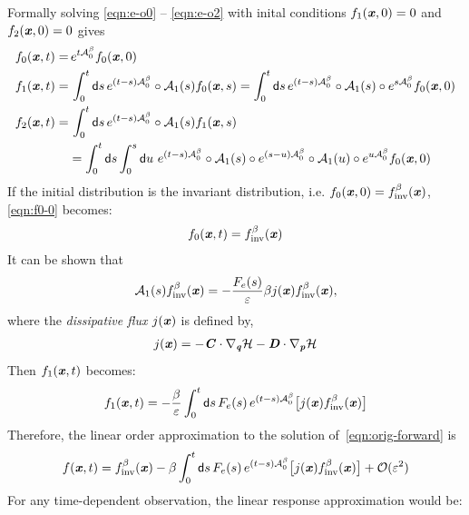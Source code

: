 \documentclass[aip,jcp,a4paper,reprint,onecolumn]{revtex4-1}
\newcommand{\vect}[1]{\textbf{\textit{#1}}}
\newcommand{\dd}{\textsf{d}}
\newcommand{\inv}{\textrm{inv}}
\newcommand{\mh}{\mathcal H}
\newcommand{\mo}{\mathcal O}
\newcommand{\fwg}{{\mathcal A}}
\begin{document}
Formally solving \eqref{eqn:e-o0} -- \eqref{eqn:e-o2} with
inital conditions $f_1(\vect x, 0) = 0$ and $f_2(\vect x, 0) = 0$
gives
\begin{align}\label{eqn:f0-0}
  f_0(\vect x, t)
  =&\,
  e^{t\fwg^\beta_0}f_0(\vect x, 0) \\\label{eqn:f1-0}
  f_1(\vect x, t)
  =&\,
  \int_0^t\dd s\,
  e^{(t-s)\fwg^\beta_0}\circ
  \fwg_1(s) f_0(\vect x,s)
  =
  \int_0^t\dd s\,
  e^{(t-s)\fwg^\beta_0}\circ
  \fwg_1(s)\circ
  e^{s\fwg^\beta_0}f_0(\vect x, 0) \\\nonumber
  f_2(\vect x, t)
  =&\,
  \int_0^t\dd s\,
  e^{(t-s)\fwg^\beta_0}\circ
  \fwg_1(s) f_1(\vect x,s) \\\label{eqn:f2-0}
  &=
  \int_0^t\dd s
  \int_0^s\dd u\,\,
  e^{(t-s)\fwg^\beta_0}\circ
  \fwg_1(s)\circ
  e^{(s-u)\fwg^\beta_0}\circ
  \fwg_1(u)\circ
  e^{u\fwg^\beta_0}
  f_0(\vect x, 0) 
\end{align}
If the initial distribution is the invariant distribution, i.e.
$f_0(\vect x, 0) = f_{\inv}^\beta(\vect x)$,
\eqref{eqn:f0-0} becomes:
\begin{align}
  f_0(\vect x, t) = f_{\inv}^\beta(\vect x)
\end{align}
It can be shown that
\begin{align}
  \fwg_1(s) f_{\inv}^\beta(\vect x)
  =
  -\frac{F_e(s)}{\varepsilon}\beta
  j(\vect x)
  f_{\inv}^\beta(\vect x),
\end{align}
where the \emph{dissipative flux} $j(\vect x)$ is defined by,
\begin{align}
  j(\vect x) =
  -\vect C\cdot\nabla_{\vect q}\mh 
  -\vect D\cdot\nabla_{\vect p}\mh
\end{align}
Then $f_1(\vect x, t)$ becomes:
\begin{align}
  f_1(\vect x, t)
  =
  -\frac\beta\varepsilon
  \int_0^t\dd s\,
  F_e(s)\,
  e^{(t-s)\fwg^\beta_0}
  \big[
  j(\vect x)
  f_{\inv}^\beta(\vect x)
  \big]
\end{align}
Therefore, the linear order approximation to
the solution of~\eqref{eqn:orig-forward} is 
\begin{align}\label{eqn:solv-orig-linear}
  f(\vect x, t) =
  f_{\inv}^\beta(\vect x)
  - \beta
  \int_0^t\dd s\,
  F_e(s)\,
  e^{(t-s)\fwg^\beta_0}
  \big[
  j(\vect x)
  f_{\inv}^\beta(\vect x)
  \big]
  + \mo(\varepsilon^2)
\end{align}
For any time-dependent observation, the linear response approximation
would be:
\end{document}
